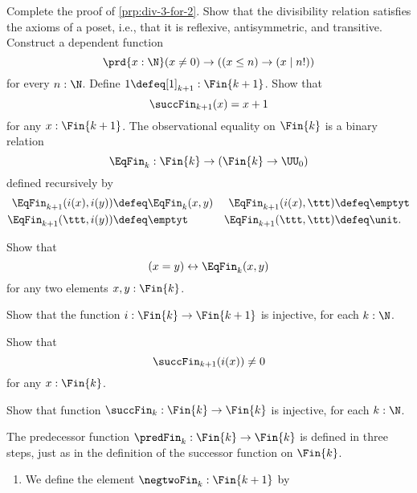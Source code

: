 \begin{exercises}
  \exitem \label{ex:div-3-for-2}Complete the proof of \cref{prp:div-3-for-2}.
  \exitem \label{ex:is-poset-div}Show that the divisibility relation satisfies the axioms of a poset, i.e., that it is reflexive, antisymmetric, and transitive.
  \exitem \label{ex:div-factorial}Construct a dependent function
  \begin{equation*}
    \prd{x:\N}(x\neq 0)\to ((x\leq n)\to (x\mid n!))
  \end{equation*}
  for every $n:\N$.
  \exitem Define $1\defeq[1]_{k+1}:\Fin{k+1}$. Show that
  \begin{equation*}
    \succFin_{k+1}(x)=x+1
  \end{equation*}
  for any $x:\Fin{k+1}$.
  \exitem \label{ex:Eq-Fin}The observational equality on $\Fin{k}$ is a binary relation
  \begin{equation*}
    \EqFin_{k}:\Fin{k}\to(\Fin{k}\to\UU_0)
  \end{equation*}
  defined recursively by
  \begin{align*}
    \EqFin_{k+1}(i(x),i(y)) & \defeq \EqFin_k(x,y) & \EqFin_{k+1}(i(x),\ttt) & \defeq \emptyt \\*
    \EqFin_{k+1}(\ttt,i(y)) & \defeq \emptyt & \EqFin_{k+1}(\ttt,\ttt) & \defeq \unit.
  \end{align*}
  \begin{subexenum}
  \item \label{ex:eq-iff-Eq-Fin}Show that
  \begin{equation*}
    (x=y)\leftrightarrow \EqFin_k(x,y)
  \end{equation*}
  for any two elements $x,y:\Fin{k}$.
  \item \label{ex:is-injective-i-Fin}Show that the function $i:\Fin{k}\to\Fin{k+1}$ is injective, for each $k:\N$.
  \item \label{ex:neq-zero-succ-Fin}
  Show that
  \begin{equation*}
    \succFin_{k+1}(i(x))\neq 0
  \end{equation*}
  for any $x:\Fin{k}$.
  \item Show that function $\succFin_k:\Fin{k}\to\Fin{k}$ is injective, for each $k:\N$.
  \end{subexenum}
  \exitem \label{ex:has-inverse-succ-Fin}The predecessor function $\predFin_k:\Fin{k}\to\Fin{k}$ is defined in three steps, just as in the definition of the successor function on $\Fin{k}$.
  \begin{enumerate}
  \item We define the element $\negtwoFin_k:\Fin{k+1}$ by

\end{enumerate}
\end{exercises}
